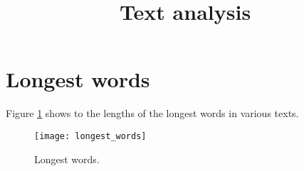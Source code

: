 \documentclass[11pt, a4paper, final]{article}
\title{Text analysis}
\begin{document}
\maketitle

\section{Longest words}

Figure \ref{fig:longest_words} shows to the lengths of the longest words in various texts.

\begin{figure}[htb]
\centering
\texttt{[image: longest\_words]}
\caption{Longest words.}
\label{fig:longest_words}
\end{figure}
\end{document}
